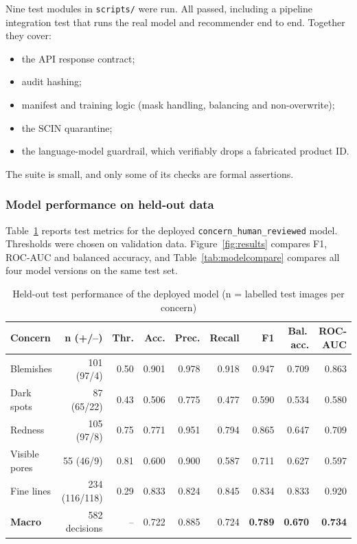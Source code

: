 Nine test modules in \texttt{scripts/} were run. All passed, including a pipeline integration test that runs the real model and recommender end to end. Together they cover:
\begin{itemize}
  \item the API response contract;
  \item audit hashing;
  \item manifest and training logic (mask handling, balancing and non-overwrite);
  \item the SCIN quarantine;
  \item the language-model guardrail, which verifiably drops a fabricated product ID.
\end{itemize}
The suite is small, and only some of its checks are formal assertions.

\subsubsection*{Model performance on held-out data}

Table~\ref{tab:results} reports test metrics for the deployed \texttt{concern\_human\_reviewed} model. Thresholds were chosen on validation data. Figure~\ref{fig:results} compares F1, ROC-AUC and balanced accuracy, and Table~\ref{tab:modelcompare} compares all four model versions on the same test set.

\begin{table}[ht]
\centering\small
\caption{Held-out test performance of the deployed model (n = labelled test images per concern)}
\label{tab:results}
\setlength{\tabcolsep}{4pt}
\begin{tabular}{lrrrrrrrr}
\toprule
\textbf{Concern} & \textbf{n (+/--)} & \textbf{Thr.} & \textbf{Acc.} & \textbf{Prec.} & \textbf{Recall} & \textbf{F1} & \textbf{Bal.\,acc.} & \textbf{ROC-AUC}\\
\midrule
Blemishes & 101 (97/4) & 0.50 & 0.901 & 0.978 & 0.918 & 0.947 & 0.709 & 0.863\\
Dark spots & 87 (65/22) & 0.43 & 0.506 & 0.775 & 0.477 & 0.590 & 0.534 & 0.580\\
Redness & 105 (97/8) & 0.75 & 0.771 & 0.951 & 0.794 & 0.865 & 0.647 & 0.709\\
Visible pores & 55 (46/9) & 0.81 & 0.600 & 0.900 & 0.587 & 0.711 & 0.627 & 0.597\\
Fine lines & 234 (116/118) & 0.29 & 0.833 & 0.824 & 0.845 & 0.834 & 0.833 & 0.920\\
\midrule
\textbf{Macro} & 582 decisions & -- & 0.722 & 0.885 & 0.724 & \textbf{0.789} & \textbf{0.670} & \textbf{0.734}\\
\bottomrule
\end{tabular}

\end{table}

